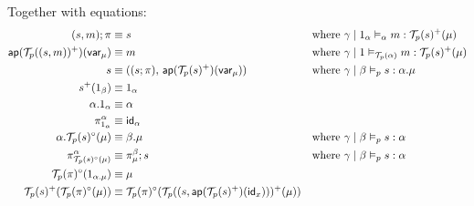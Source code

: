 \documentclass[10pt]{article}
\let\emptyset\varnothing
\newcommand{\yields}{\vdash}
\newcommand{\type}{\,\,\mathsf{mtype}}
\newcommand\TermTwoT[5]{\ensuremath{#1 \mid #3 \vDash_{#5} #2 : #4}}
\newcommand{\id}{\mathsf{id}}
\begin{document}
Together with equations:
\begin{align}
\label{beta-pi}
(s, m);\pi &\equiv s && \text{where } \TermTwoT{\gamma}{m}{1_\alpha}{\El{p}{s}^+(\mu)}{\alpha}\\
\label{beta-var}
\mathsf{ap}(\El{p}{(s,m)}^+)(\mathsf{var}_\mu) &\equiv m && \text{where } \TermTwoT{\gamma}{m}{1}{\El{p}{s}^+(\mu)}{\El{p}{\alpha}} \\
\label{eta-pi-var}
s &\equiv ((s;\pi), \, \mathsf{ap}(\El{p}{s}^+)(\mathsf{var}_\mu)) && \text{where } \TermTwoT{\gamma}{s}{\beta}{\alpha.\mu}{p} \\
\label{s-plus-one-strict}
s^+(1_\beta) &\equiv 1_\alpha \\
\label{dot-one-strict}
\alpha.1_\alpha &\equiv \alpha \\
\label{pi-one-strict}
\pi^\alpha_{1_\alpha} &\equiv \id_\alpha \\
\label{dot-circ}
\alpha.\El{p}{s}^\circ(\mu) &\equiv \beta.\mu && \text{where } \TermTwoT{\gamma}{s}{\beta}{\alpha}{p}\\
\label{pi-dot-circ}
\pi^\alpha_{\El{p}{s}^\circ(\mu)} &\equiv \pi^\beta_\mu;s && \text{where } \TermTwoT{\gamma}{s}{\beta}{\alpha}{p}\\
\label{circ-one}
\El{p}{\pi}^\circ(1_{\alpha.\mu}) &\equiv \mu \\
\label{pi-circ-morphism-of-fibrations}
\El{p}{s}^+(\El{p}{\pi}^\circ(\mu)) &\equiv \El{p}{\pi}^\circ(\El{p}{(s, \mathsf{ap}(\El{p}{s}^+)(\id_x))}^+(\mu))
\end{align}
\end{document}
